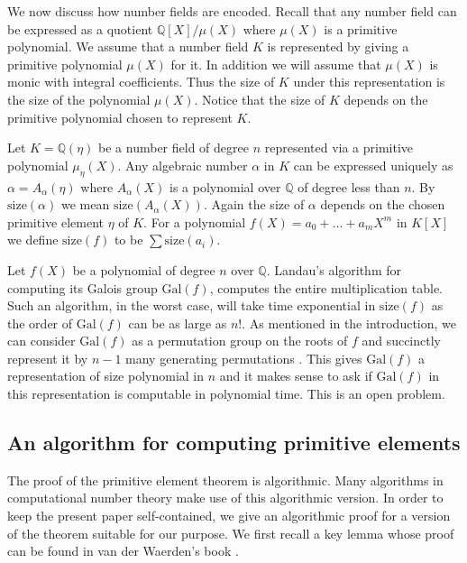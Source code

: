 \documentclass[prodmod,acmtalg]{acmsmall}
\newcommand{\size}[1]{{\ensuremath{\mathrm{size}\left(#1\right)}}}
\newcommand{\Gal}[1]{{\ensuremath{\mathrm{Gal}\left(#1\right)}}}
\newcommand{\Q}{\ensuremath{\mathbb{Q}}}
\begin{document}
We now discuss how number fields are encoded. Recall that any number
field can be expressed as a quotient $\Q[X]/\mu(X)$ where $\mu(X)$ is
a primitive polynomial. We assume that a number field $K$ is
represented by giving a primitive polynomial $\mu(X)$ for it. In
addition we will assume that $\mu(X)$ is monic with integral
coefficients. Thus the size of $K$ under this representation is the
size of the polynomial $\mu(X)$. Notice that the size of $K$ depends
on the primitive polynomial chosen to represent $K$.

Let $K = \Q(\eta)$ be a number field of degree $n$ represented via a
primitive polynomial $\mu_\eta(X)$. Any algebraic number $\alpha$ in
$K$ can be expressed uniquely as $\alpha = A_\alpha(\eta)$ where
$A_\alpha(X)$ is a polynomial over $\Q$ of degree less than $n$.  By
$\size{\alpha}$ we mean $\size{A_\alpha(X)}$.  Again the size of
$\alpha$ depends on the chosen primitive element $\eta$ of $K$. For a
polynomial $f(X) = a_0 + \ldots + a_m X^m$ in $K[X]$ we define
$\size{f}$ to be $\sum \size{a_i}$.

Let $f(X)$ be a polynomial of degree $n$ over $\Q$. Landau's algorithm
\cite{landau84galois} for computing its Galois group $\Gal{f}$,
computes the entire multiplication table. Such an algorithm, in the
worst case, will take time exponential in $\size{f}$ as the order of
$\Gal{f}$ can be as large as $n!$. As mentioned in the introduction,
we can consider $\Gal{f}$ as a permutation group on the roots of $f$
and succinctly represent it by $n-1$ many generating permutations
\cite{luks93permutation}. This gives $\Gal{f}$ a representation of
size polynomial in $n$ and it makes sense to ask if $\Gal{f}$ in this
representation is computable in polynomial time. This is an open
problem.



\subsection{An algorithm for computing primitive elements}

The proof of the primitive element theorem is algorithmic. Many
algorithms in computational number theory make use of this algorithmic
version. In order to keep the present paper self-contained, we give an
algorithmic proof for a version of the theorem suitable for our
purpose. We first recall a key lemma whose proof can be found in van
der Waerden's book \cite{waerden:1991}.
\end{document}
